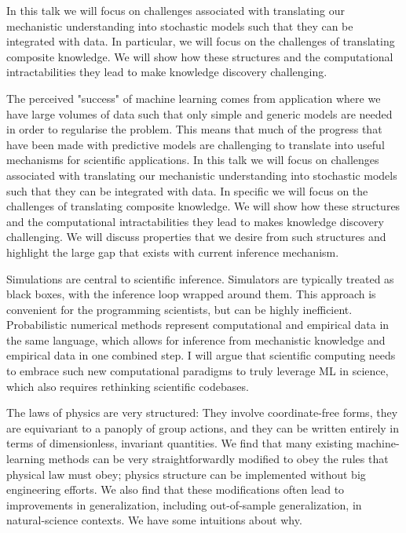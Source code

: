 \documentclass[a4paper,UKenglish]{dagrep-v2018}
\begin{document}
In this talk we will focus on challenges associated with translating our mechanistic understanding into stochastic models such that they can be integrated with data. In particular, we will focus on the challenges of translating composite knowledge. We will show how these structures and the computational intractabilities they lead to make knowledge discovery challenging. 

The perceived "success" of machine learning comes from application where we have large volumes of data such that only simple and generic models are needed in order to regularise the problem. This means that much of the progress that have been made with predictive models are challenging to translate into useful mechanisms for scientific applications. In this talk we will focus on challenges associated with translating our mechanistic understanding into stochastic models such that they can be integrated with data. In specific we will focus on the challenges of translating composite knowledge. We will show how these structures and the computational intractabilities they lead to makes knowledge discovery challenging. We will discuss properties that we desire from such structures and highlight the large gap that exists with current inference mechanism.

\license

Simulations are central to scientific inference. Simulators are typically treated as black boxes, with the inference loop wrapped around them. This approach is convenient for the programming scientists, but can be highly inefficient. Probabilistic numerical methods represent computational and empirical data in the same language, which allows for inference from mechanistic knowledge and empirical data in one combined step. I will argue that scientific computing needs to embrace such new computational paradigms to truly leverage ML in science, which also requires rethinking scientific codebases.

\license

The laws of physics are very structured: They involve coordinate-free forms, they are equivariant to a panoply of group actions, and they can be written entirely in terms of dimensionless, invariant quantities. We find that many existing machine-learning methods can be very straightforwardly modified to obey the rules that physical law must obey; physics structure can be implemented without big engineering efforts. We also find that these modifications often lead to improvements in generalization, including out-of-sample generalization, in natural-science contexts. We have some intuitions about why.
\end{document}
